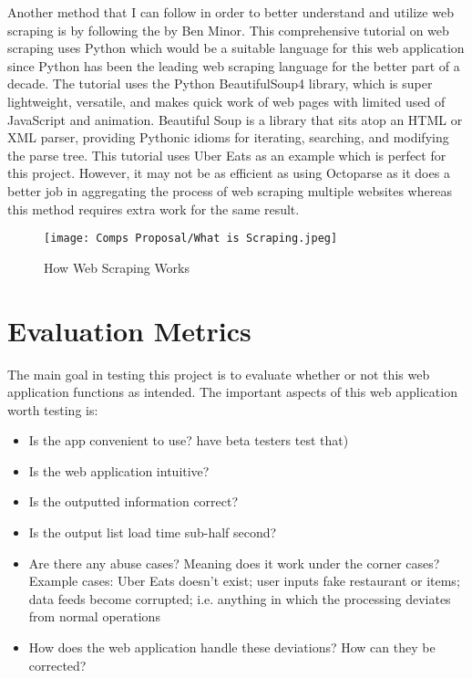 \documentclass[10pt,twocolumn]{article}
\begin{document}
Another method that I can follow in order to better understand and utilize web scraping is by following the  by Ben Minor. This comprehensive tutorial on web scraping uses Python which would be a suitable language for this web application since Python has been the leading web scraping language for the better part of a decade. The tutorial uses the Python BeautifulSoup4 library, which is super lightweight, versatile, and makes quick work of web pages with limited used of JavaScript and animation. Beautiful Soup is a library that sits atop an HTML or XML parser, providing Pythonic idioms for iterating, searching, and modifying the parse tree. This tutorial uses Uber Eats as an example which is perfect for this project. However, it may not be as efficient as using Octoparse as it does a better job in aggregating the process of web scraping multiple websites whereas this method requires extra work for the same result.

\begin{figure}
    \centering
    \texttt{[image: Comps Proposal/What is Scraping.jpeg]}
    \caption{
        How Web Scraping Works
    }
    \label{fig:second-page-4}
\end{figure}

\section{Evaluation Metrics}

The main goal in testing this project is to evaluate whether or not this web application functions as intended. The important aspects of this web application worth testing is:

\begin{itemize}
    \item Is the app convenient to use? have beta testers test that)
    \item Is the web application intuitive?
    \item Is the outputted information correct?
    \item Is the output list load time sub-half second?
    \item Are there any abuse cases? Meaning does it work under the corner cases? 
    \subitem Example cases: Uber Eats doesn't exist; user inputs fake restaurant or items; data feeds become corrupted; i.e. anything in which the processing deviates from normal operations
    \item How does the web application handle these deviations? How can they be corrected?
\end{itemize}
\end{document}
